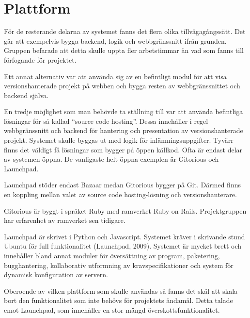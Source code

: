 \section{Plattform}
För de resterande delarna av systemet fanns det flera olika tillvägagångssätt. Det går att exempelvis bygga backend, logik och webbgränssnitt ifrån grunden. Gruppen befarade att detta skulle uppta fler arbetstimmar än vad som fanns till förfogande för projektet.

Ett annat alternativ var att använda sig av en befintligt modul för att visa versionshanterade projekt på webben och bygga resten av webbgränssnittet och backend själva.

En tredje möjlighet som man behövde ta ställning till var att använda befintliga lösningar för så kallad “source code hosting”. Dessa innehåller i regel webbgränssnitt och backend för hantering och presentation av versionshanterade projekt. Systemet skulle byggas ut med logik för inlämningsuppgifter. Tyvärr finns det väldigt få lösningar som bygger på öppen källkod. Ofta är endast delar av systemen öppna. De vanligaste helt öppna exemplen är Gitorious och Launchpad.

Launchpad stöder endast Bazaar medan Gitorious bygger på Git. Därmed finns en koppling mellan valet av source code hosting-lösning och versionshanterare.

Gitorious är byggt i språket Ruby med ramverket Ruby on Rails. Projektgruppen har erfarenhet av ramverket sen tidigare. 

Launchpad är skrivet i Python och Javascript. Systemet kräver i skrivande stund Ubuntu för full funktionalitet (Launchpad, 2009). Systemet är mycket brett och innehåller bland annat moduler för översättning av program, paketering, bugghantering, kollaborativ utformning av kravspecifikationer och system för dynamisk konfiguration av servern.

Oberoende av vilken plattform som skulle användas så fanns det skäl att skala bort den funktionalitet som inte behövs för projektets ändamål. Detta talade emot Launchpad, som innehåller en stor mängd överskottsfunktionalitet.
